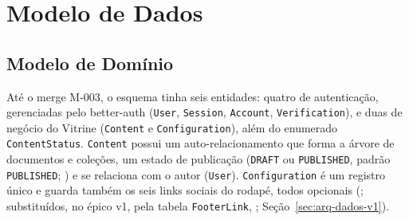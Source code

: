 
\section{Modelo de Dados}\label{sec:arq-dados}

\subsection{Modelo de Domínio}

Até o merge M-003, o esquema tinha seis entidades: quatro de autenticação, gerenciadas pelo better-auth (\texttt{User}, \texttt{Session}, \texttt{Account}, \texttt{Verification}), e duas de negócio do Vitrine (\texttt{Content} e \texttt{Configuration}), além do enumerado \texttt{ContentStatus}. \texttt{Content} possui um auto-relacionamento que forma a árvore de documentos e coleções, um estado de publicação (\texttt{DRAFT} ou \texttt{PUBLISHED}, padrão \texttt{PUBLISHED}; ) e se relaciona com o autor (\texttt{User}). \texttt{Configuration} é um registro único e guarda também os seis links sociais do rodapé, todos opcionais (; substituídos, no épico v1, pela tabela \texttt{FooterLink}, ; Seção~\ref{sec:arq-dados-v1}).

